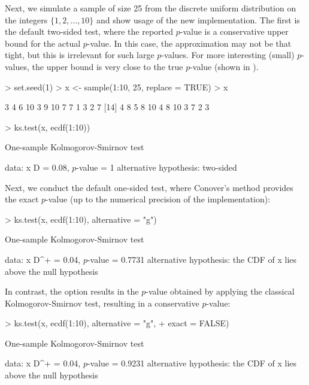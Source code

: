 Next, we simulate a sample of size 25 from the discrete uniform distribution on
the integers $\{1, 2, \ldots, 10\}$ and show usage of the
new  implementation.  The first is the default two-sided test,
where the reported $p$-value is a conservative upper bound for the actual
$p$-value.  In this case, the approximation may not be that tight, but this is
irrelevant for such large $p$-values. For more interesting (small) $p$-values, the
upper bound is very close to the true $p$-value (shown in \cite{Conover1972}).
\begin{Schunk}
\begin{Sinput}
> set.seed(1)
> x <- sample(1:10, 25, replace = TRUE)
> x
\end{Sinput}
\begin{Soutput}
 [1]  3  4  6 10  3  9 10  7  7  1  3  2  7
[14]  4  8  5  8 10  4  8 10  3  7  2  3
\end{Soutput}
\begin{Sinput}
> ks.test(x, ecdf(1:10))
\end{Sinput}
\begin{Soutput}
	One-sample Kolmogorov-Smirnov test

data:  x 
D = 0.08, $p$-value = 1
alternative hypothesis: two-sided 
\end{Soutput}
\end{Schunk}
Next, we conduct the default one-sided test, where Conover's method
provides the exact $p$-value (up to the numerical precision of the
implementation):
\begin{Schunk}
\begin{Sinput}
> ks.test(x, ecdf(1:10), alternative = "g")
\end{Sinput}
\begin{Soutput}
	One-sample Kolmogorov-Smirnov test

data:  x 
D^+ = 0.04, $p$-value = 0.7731
alternative hypothesis:
the CDF of x lies above the null hypothesis 
\end{Soutput}
\end{Schunk}
In contrast, the option  results in the
$p$-value obtained by applying the classical Kolmogorov-Smirnov
test, resulting in a conservative $p$-value:
\begin{Schunk}
\begin{Sinput}
> ks.test(x, ecdf(1:10), alternative = "g", 
+         exact = FALSE)
\end{Sinput}
\begin{Soutput}
	One-sample Kolmogorov-Smirnov test

data:  x 
D^+ = 0.04, $p$-value = 0.9231
alternative hypothesis:
the CDF of x lies above the null hypothesis 
\end{Soutput}
\end{Schunk}


